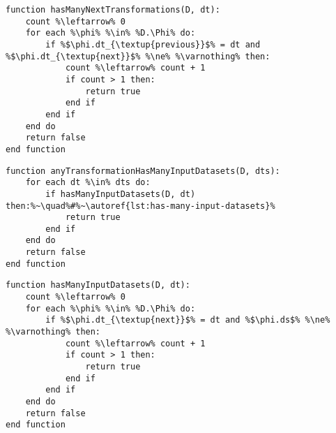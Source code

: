 \begin{minipage}[c]{0.95\textwidth} \begin{lstlisting}[language=pseudocode,label={lst:has-many-next-transformations},caption={[Contagem das próximas transformações de dados de uma transformação]Contagem das próximas transformações de dados de uma transformação de dados. Retorna verdadeiro caso essa quantidade seja maior do que um, e falso caso contrário.}]
function hasManyNextTransformations(D, dt):
    count %\leftarrow% 0
    for each %\phi% %\in% %D.\Phi% do:
        if %$\phi.dt_{\textup{previous}}$% = dt and %$\phi.dt_{\textup{next}}$% %\ne% %\varnothing% then:
            count %\leftarrow% count + 1
            if count > 1 then:
                return true
            end if
        end if
    end do
    return false
end function
\end{lstlisting}
\end{minipage}

\vfill{}

\begin{minipage}[c]{0.95\textwidth} \begin{lstlisting}[language=pseudocode,label={lst:any-transformation-has-many-input-datasets},caption={[Determinação de se pelo menos uma transformação possui mais de um conjunto de dados de entrada.]Determinação de se pelo menos uma transformação de dados possui mais de um conjunto de dados de entrada. Retorna verdadeiro caso positivo, e falso caso contrário.}]
function anyTransformationHasManyInputDatasets(D, dts):
    for each dt %\in% dts do:
        if hasManyInputDatasets(D, dt) then:%~\quad%#%~\autoref{lst:has-many-input-datasets}%
            return true
        end if
    end do
    return false
end function
\end{lstlisting}
\end{minipage}

\vfill{}

\begin{minipage}[c]{0.95\textwidth} \begin{lstlisting}[language=pseudocode,label={lst:has-many-input-datasets},caption={[Contagem dos conjuntos de dados anteriores a uma transformação]Contagem dos conjuntos de dados anteriores a uma transformação de dados. Retorna verdadeiro caso essa quantidade seja maior do que um, e falso caso contrário.}]
function hasManyInputDatasets(D, dt):
    count %\leftarrow% 0
    for each %\phi% %\in% %D.\Phi% do:
        if %$\phi.dt_{\textup{next}}$% = dt and %$\phi.ds$% %\ne% %\varnothing% then:
            count %\leftarrow% count + 1
            if count > 1 then:
                return true
            end if
        end if
    end do
    return false
end function
\end{lstlisting}
\end{minipage}

